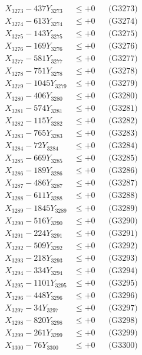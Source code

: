 \documentclass[a4paper,10pt]{article}
\begin{document}
{\begin{align}
X_{3273} - 437Y_{3273} &\leq +0 && \text{(G3273)} \\
X_{3274} - 613Y_{3274} &\leq +0 && \text{(G3274)} \\
X_{3275} - 143Y_{3275} &\leq +0 && \text{(G3275)} \\
X_{3276} - 169Y_{3276} &\leq +0 && \text{(G3276)} \\
X_{3277} - 581Y_{3277} &\leq +0 && \text{(G3277)} \\
X_{3278} - 751Y_{3278} &\leq +0 && \text{(G3278)} \\
X_{3279} - 1045Y_{3279} &\leq +0 && \text{(G3279)} \\
X_{3280} - 406Y_{3280} &\leq +0 && \text{(G3280)} \\
\allowbreak
X_{3281} - 574Y_{3281} &\leq +0 && \text{(G3281)} \\
X_{3282} - 115Y_{3282} &\leq +0 && \text{(G3282)} \\
X_{3283} - 765Y_{3283} &\leq +0 && \text{(G3283)} \\
X_{3284} - 72Y_{3284} &\leq +0 && \text{(G3284)} \\
X_{3285} - 669Y_{3285} &\leq +0 && \text{(G3285)} \\
X_{3286} - 189Y_{3286} &\leq +0 && \text{(G3286)} \\
X_{3287} - 486Y_{3287} &\leq +0 && \text{(G3287)} \\
X_{3288} - 611Y_{3288} &\leq +0 && \text{(G3288)} \\
X_{3289} - 1845Y_{3289} &\leq +0 && \text{(G3289)} \\
X_{3290} - 516Y_{3290} &\leq +0 && \text{(G3290)} \\
\allowbreak
X_{3291} - 224Y_{3291} &\leq +0 && \text{(G3291)} \\
X_{3292} - 509Y_{3292} &\leq +0 && \text{(G3292)} \\
X_{3293} - 218Y_{3293} &\leq +0 && \text{(G3293)} \\
X_{3294} - 334Y_{3294} &\leq +0 && \text{(G3294)} \\
X_{3295} - 1101Y_{3295} &\leq +0 && \text{(G3295)} \\
X_{3296} - 448Y_{3296} &\leq +0 && \text{(G3296)} \\
X_{3297} - 34Y_{3297} &\leq +0 && \text{(G3297)} \\
X_{3298} - 820Y_{3298} &\leq +0 && \text{(G3298)} \\
X_{3299} - 261Y_{3299} &\leq +0 && \text{(G3299)} \\
X_{3300} - 76Y_{3300} &\leq +0 && \text{(G3300)} \\

\end{align}}
\end{document}

